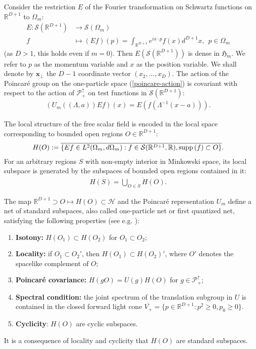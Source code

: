 \documentclass[12pt]{article}
\newcounter{axiomss}
\def\RR{{\mathbb R}}
\def\H{{\mathcal H}}
\def\P{{\mathcal P}}
\def\S{{\mathcal S}}
\def\hm{\mathfrak{H}_m}
\def\supp{{\rm supp\,}}
\def\poincare{{\P^\uparrow_+}}
\def\tx{\pmb{x}}
\theoremstyle{remark}
\begin{document}
Consider  the restriction $E$ of the Fourier transformation on Schwartz functions on $\RR^{D+1}$ to $\Omega_m:$
\begin{align*}
 E:\S(\RR^{D+1})&\rightarrow \S(\Omega_m) \\
 f&\mapsto (E f)(p)=\int_{\RR^{D+1}} e^{ix\cdot p }f(x) d^{D+1}x, \ \ p \in \Omega_m
\end{align*}
(as $D> 1$, this holds even if $m=0$). Then $E(\S(\RR^{D+1}))$ is dense in $\hm$.
We refer to $p$ as the momentum variable and $x$ as the position variable. We shall denote by $\tx_\perp$ the $D-1$ coordinate vector $(x_2,\ldots,x_D)$.
The action of the Poincar\'e group on the one-particle space (\ref{poincare-action}) is covariant with respect to the action of
$\poincare$ on test functions in $\S(\RR^{D+1})$:
\begin{align*}
 (U_m((\Lambda,a))E f)(x) = E (f(\Lambda^{-1}(x-a))).
\end{align*}

The local structure of the free scalar field is encoded in the local space corresponding to bounded open regions $O \in \RR^{D+1}$:
\begin{align}
 H(O):= \overline{\{Ef \in L^2(\Omega_m,d\Omega_m): f\in \mathcal{S}(\RR^{D+1},\RR), \supp(f)\subset O  \}}.\label{local-subspace}
\end{align}
For an arbitrary regions $S$ with non-empty interior in Minkowski space, its local subspace is generated by the subspaces of bounded open regions contained in it:
\begin{align*}
 H(S)=\overline{\bigcup\limits_{O\in S}H(O)}.
\end{align*}



The map $\RR^{D+1}\supset O\mapsto H(O)\subset \H$  and the Poincar\'e representation $U_m$ define a net of standard subspaces,
also called one-particle net or first quantized net, satisfying the following properties (see e.g.\! \cite{BGL02}):
\begin{enumerate}[{(SS}1{)}]
\item {\bf Isotony:} $H(O_1) \subset H(O_2)$ for $O_1 \subset O_2$;
\item {\bf Locality:} if $O_1\subset O_2'$, then $H(O_1)\subset H(O_2)'$, where $O'$ denotes the spacelike complement of $O$;
\item {\bf Poincar\'e covariance:} $H(gO) = U(g)H(O)$ for 
$g \in {\P}^\uparrow_+$;
\item {\bf Spectral condition:} 
the joint spectrum of the translation subgroup in $U$ is contained in the closed forward light cone
 $\overline {V_+}=\{p\in\RR^{D+1}: p^2\geq0, p_0\geq0\}$.
\item {\bf Cyclicity}: $H(O)$ are cyclic subspaces.
\setcounter{axiomss}{\value{enumi}}
\end{enumerate}
It is a consequence of locality and cyclicity that $H(O)$ are standard subspaces.
\end{document}
